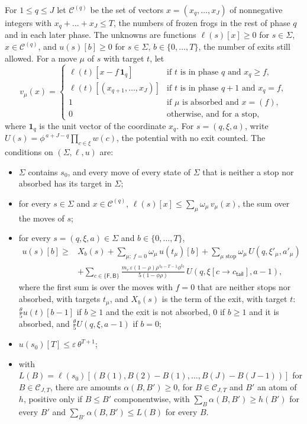 \documentclass[11pt]{amsart}
\theoremstyle{definition}
\numberwithin{equation}{section}
\newcommand{\cC}{\mathcal{C}}
\newcommand{\eps}{\varepsilon}
\newcommand{\one}{\mathbf{1}}
\begin{document}
For $1\le q\le J$ let $\cC^{(q)}$ be the set of vectors $x=(x_q,\dots,x_J)$ of nonnegative integers with $x_q+\dots+x_J\le T$, the numbers of frozen frogs in the rest of phase $q$ and in each later phase. The unknowns are functions $\ell(s)[x]\ge0$ for $s\in\Sigma$, $x\in\cC^{(q)}$, and $u(s)[b]\ge0$ for $s\in\Sigma$, $b\in\{0,\dots,T\}$, the number of exits still allowed. For a move $\mu$ of $s$ with target $t$, let
\[
v_\mu(x)=\begin{cases}
\ell(t)[x-f\,\one_q] & \text{if } t \text{ is in phase } q \text{ and } x_q\ge f,\\
\ell(t)[(x_{q+1},\dots,x_J)] & \text{if } t \text{ is in phase } q+1 \text{ and } x_q=f,\\
1 & \text{if } \mu \text{ is absorbed and } x=(f),\\
0 & \text{otherwise, and for a stop},
\end{cases}
\]
where $\one_q$ is the unit vector of the coordinate $x_q$. For $s=(q,\xi,a)$, write $U(s)=\phi^{\,a+J-q}\prod_{c\in\xi}w(c)$, the potential with no exit counted. The conditions on $(\Sigma,\ell,u)$ are:
\begin{itemize}
\item[(C3)] $\Sigma$ contains $s_0$, and every move of every state of $\Sigma$ that is neither a stop nor absorbed has its target in $\Sigma$;
\item[(C4)] for every $s\in\Sigma$ and $x\in\cC^{(q)}$, $\ell(s)[x]\le\sum_\mu\omega_\mu\,v_\mu(x)$, the sum over the moves of $s$;
\item[(C5)] for every $s=(q,\xi,a)\in\Sigma$ and $b\in\{0,\dots,T\}$,
\[
\begin{aligned}
u(s)[b]\ge{}&X_b(s)+\sum_{\mu:\ f=0}\omega_\mu\,u(t_\mu)[b]+\sum_{\mu \text{ stop}}\omega_\mu\,U(q,\xi'_\mu,a'_\mu)\\
&+\sum_{c\in\{\mathsf F,\mathsf B\}}\frac{m_c\,\eps(1-\rho)\rho^{\,t_0-T-1}\phi^{t_0}}{5(1-\phi\rho)}\,U(q,\xi[c\to c_{\mathsf{tail}}],a-1),
\end{aligned}
\]
where the first sum is over the moves with $f=0$ that are neither stops nor absorbed, with targets $t_\mu$, and $X_b(s)$ is the term of the exit, with target $t$: $\frac{\theta}{5}u(t)[b-1]$ if $b\ge1$ and the exit is not absorbed, $0$ if $b\ge1$ and it is absorbed, and $\frac{\theta}{5}U(q,\xi,a-1)$ if $b=0$;
\item[(C6)] $u(s_0)[T]\le\eps\,\theta^{T+1}$;
\item[(C7)] with $L(B)=\ell(s_0)[(B(1),B(2)-B(1),\dots,B(J)-B(J-1))]$ for $B\in \cC_{J,T}$, there are amounts $\alpha(B,B')\ge0$, for $B\in \cC_{J,T}$ and $B'$ an atom of $h$, positive only if $B\le B'$ componentwise, with $\sum_B\alpha(B,B')\ge h(B')$ for every $B'$ and $\sum_{B'}\alpha(B,B')\le L(B)$ for every $B$.
\end{itemize}
\end{document}
